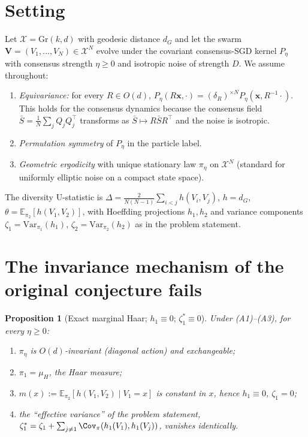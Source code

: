 \documentclass[11pt]{article}
\newtheorem{proposition}[theorem]{Proposition}
\theoremstyle{definition}
\newcommand{\Gr}{\mathrm{Gr}}
\newcommand{\E}{\mathbb{E}}
\newcommand{\Var}{\mathrm{Var}}
\newcommand{\dG}{d_G}
\newcommand{\cX}{\mathcal{X}}
\begin{document}
\section{Setting}
Let $\cX=\Gr(k,d)$ with geodesic distance $\dG$ and let the swarm
$\mathbf V=(V_1,\dots,V_N)\in\cX^N$ evolve under the covariant consensus-SGD kernel
$P_\eta$ with consensus strength $\eta\ge0$ and isotropic noise of strength $D$.
We assume throughout:
\begin{enumerate}
\item[(A1)] \emph{Equivariance:} for every $R\in O(d)$,
$P_\eta(R\mathbf x,\cdot)=(\delta_{R})^{\times N} P_\eta(\mathbf x,R^{-1}\cdot)$.
This holds for the consensus dynamics because the consensus field
$\bar S=\frac1N\sum_j Q_jQ_j^\top$ transforms as $\bar S\mapsto R\bar SR^\top$ and the
noise is isotropic.
\item[(A2)] \emph{Permutation symmetry} of $P_\eta$ in the particle label.
\item[(A3)] \emph{Geometric ergodicity} with unique stationary law $\pi_\eta$ on $\cX^N$
(standard for uniformly elliptic noise on a compact state space).
\end{enumerate}
The diversity U-statistic is $\Delta=\frac{2}{N(N-1)}\sum_{i<j}h(V_i,V_j)$,
$h=\dG$, $\theta=\E_{\pi_2}[h(V_1,V_2)]$, with Hoeffding projections $h_1,h_2$ and
variance components $\zeta_1=\Var_{\pi_1}(h_1)$, $\zeta_2=\Var_{\pi_2}(h_2)$ as in the
problem statement.

\section{The invariance mechanism of the original conjecture fails}

\begin{proposition}[Exact marginal Haar; $h_1\equiv0$; $\zeta_1^*\equiv0$]
\label{prop:inv}
Under (A1)--(A3), for every $\eta\ge0$:
\begin{enumerate}
\item $\pi_\eta$ is $O(d)$-invariant (diagonal action) and exchangeable;
\item $\pi_{1}=\mu_H$, the Haar measure;
\item $m(x):=\E_{\pi_2}[h(V_1,V_2)\mid V_1=x]$ is constant in $x$, hence
$h_1\equiv0$, $\zeta_1=0$;
\item the ``effective variance'' of the problem statement,
$\zeta_1^*=\zeta_1+\sum_{j\ne1}\Cov_\pi(h_1(V_1),h_1(V_j))$, vanishes identically.
\end{enumerate}
\end{proposition}
\end{document}
